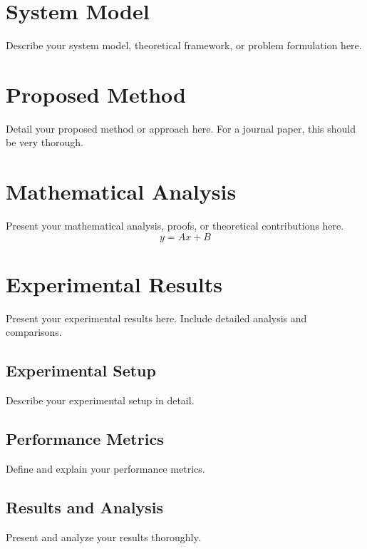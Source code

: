 \documentclass[journal,twoside]{IEEEtran}
\begin{document}
\section{System Model}
Describe your system model, theoretical framework, or problem formulation here.

\section{Proposed Method}
Detail your proposed method or approach here. For a journal paper, this should be very thorough.

\section{Mathematical Analysis}
Present your mathematical analysis, proofs, or theoretical contributions here.
\begin{equation}
\label{eq1}
y = Ax + B
\end{equation}

\section{Experimental Results}
Present your experimental results here. Include detailed analysis and comparisons.

\subsection{Experimental Setup}
Describe your experimental setup in detail.

\subsection{Performance Metrics}
Define and explain your performance metrics.

\subsection{Results and Analysis}
Present and analyze your results thoroughly.


\end{document}
